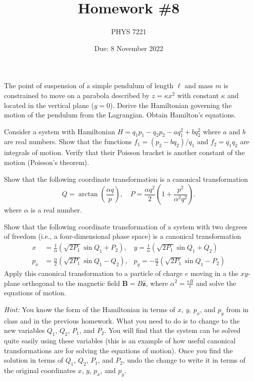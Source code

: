\documentclass{jhwhw}
\author{PHYS 7221}
\title{Homework \#8}
\date{Due: 8 November 2022}
\begin{document}

The point of suspension of a simple pendulum of length $\ell$ and mass $m$ is constrained to move on a parabola described by $z = \kappa x^{2}$ with constant $\kappa$ and located in the vertical plane ($y = 0$). Derive the Hamiltonian governing the motion of the pendulum from the Lagrangian. Obtain Hamilton's equations.


Consider a system with Hamiltonian $H = q_{1} p_{1} - q_{2} p_{2} - a q_{1}^{2} + b q_{2}^{2}$ where $a$ and $b$ are real numbers. Show that the functions $f_{1} = (p_{2} - b q_{2})/ q_{1}$ and $f_{2} = q_{1}q_{2}$ are integrals of motion. Verify that their Poisson bracket is another constant of the motion (Poisson's theorem).


Show that the following coordinate transformation is a canonical transformation
\begin{equation}
  \label{eq:1}
  Q = \arctan\left(\frac{\alpha q}{p} \right), \quad P = \frac{\alpha q^{2}}2\left( 1 + \frac{p^{2}}{\alpha^{2} q^{2}}\right).
\end{equation}
where $\alpha$ is a real number.


Show that the following coordinate transformation of a system with two degrees of freedom (i.e., a four-dimensional phase space) is a canonical transformation
\begin{align}
  \label{eq:2}
  x & = \frac1{\alpha} ( \sqrt{2 P_{1}} \sin Q_{1} + P_{2} ), & y = \frac1{\alpha}( \sqrt{2 P_{1}} \sin Q_{1} + Q_{2} ) \\
  p_{x} & = \frac \alpha 2( \sqrt{2 P_{1}} \sin Q_{1} - Q_{2} ), & p_{y} = - \frac{\alpha}2 ( \sqrt{2 P_{1}} \sin Q_{1} - P_{2} )
\end{align}
Apply this canonical transformation to a particle of charge $e$ moving in a the $xy$-plane orthogonal to the magnetic field $\mathbf B = B \hat{\mathbf z}$, where $\alpha^2 = \frac{e B}{c}$ and solve the equations of motion.

\emph{Hint:} You know the form of the Hamiltonian in terms of $x$, $y$, $p_{x}$, and $p_{y}$ from in class and in the previous homework.
What you need to do is to change to the new variables $Q_{1}$, $Q_{2}$, $P_{1}$, and $P_{2}$.
You will find that the system can be solved quite easily using these variables (this is an example of how useful canonical transformations are for solving the equations of motion).
Once you find the solution in terms of $Q_{1}$, $Q_{2}$, $P_{1}$, and $P_{2}$, undo the change to write it in terms of the original coordinates $x$, $y$, $p_{x}$, and $p_{y}$.
\end{document}
